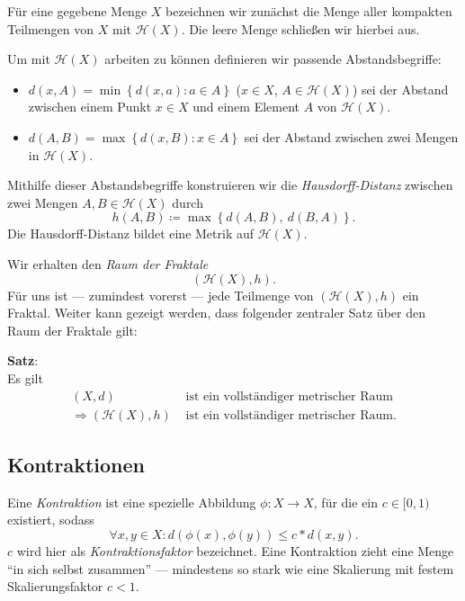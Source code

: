 \documentclass[afourpaper]{latex-classes/handout}
\begin{document}
Für eine gegebene Menge \( X \) bezeichnen wir zunächst die Menge aller kompakten Teilmengen von \( X \) mit \( \mathcal{H}(X) \). Die leere Menge schließen wir hierbei aus.

Um mit \( \mathcal{H}(X) \) arbeiten zu können definieren wir passende Abstandsbegriffe:
\begin{itemize}
  \item \( d(x,A) = \min\left \{ d(x,a) : a \in A \right \} \) (\( x \in X \), \( A \in \mathcal{H}(X) \)) sei der Abstand zwischen einem Punkt \( x \in X \) und einem Element \( A \) von \( \mathcal{H}(X) \).
  \item \( d(A,B) = \max\left \{ d(x,B) : x \in A \right \} \) sei der Abstand zwischen zwei Mengen in \( \mathcal{H}(X) \).
\end{itemize}

Mithilfe dieser Abstandsbegriffe konstruieren wir die \emph{Hausdorff-Distanz} zwischen zwei Mengen \( A,B \in \mathcal{H}(X) \) durch
\begin{equation*}
  h(A,B) \coloneqq \max\left \{ d(A,B),\ d(B,A) \right \}\text{.}
\end{equation*}
Die Hausdorff-Distanz bildet eine Metrik auf \( \mathcal{H}(X) \).

Wir erhalten den \emph{Raum der Fraktale}
\begin{equation*}
  (\mathcal{H}(X), h)\text{.}
\end{equation*}
Für uns ist --- zumindest vorerst --- jede Teilmenge von \( (\mathcal{H}(X), h) \) ein Fraktal. Weiter kann gezeigt werden, dass folgender zentraler Satz über den Raum der Fraktale gilt:

\begin{theorembox}
  \textbf{Satz}:  \\
  \vspace{1mm}
  Es gilt
  \begin{align*}
    (X,d) &\text{ ist ein vollständiger metrischer Raum} \\
    \Rightarrow (\mathcal{H}(X), h) &\text{ ist ein vollständiger metrischer Raum.}
  \end{align*}
\end{theorembox}

\subsection{Kontraktionen}

Eine \emph{Kontraktion} ist eine spezielle Abbildung \( \phi: X \to X \), für die ein \( c \in [0,1) \) existiert, sodass
\begin{equation*}
  \forall x,y \in X : d(\phi(x), \phi(y)) \bm{\leq} c * d(x,y)\text{.}
\end{equation*}
\( c \) wird hier als \emph{Kontraktionsfaktor} bezeichnet.
Eine Kontraktion zieht eine Menge ``in sich selbst zusammen'' --- mindestens so stark wie eine Skalierung mit festem Skalierungsfaktor \( c < 1 \).
\end{document}
